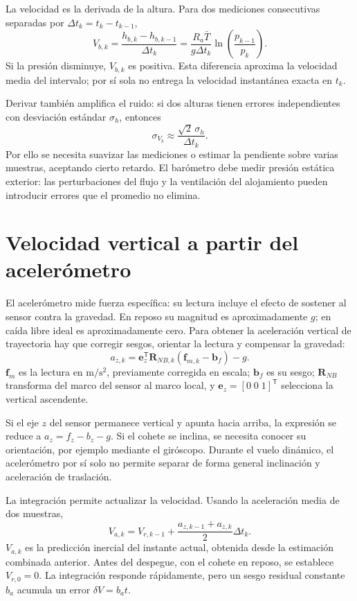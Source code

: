 \documentclass[11pt,a4paper]{article}
\begin{document}
La velocidad es la derivada de la altura. Para dos mediciones consecutivas separadas por $\Delta t_k=t_k-t_{k-1}$,
\begin{equation}
 V_{b,k}=\frac{h_{b,k}-h_{b,k-1}}{\Delta t_k}
 =\frac{R_a\bar T}{g\Delta t_k}\ln\left(\frac{p_{k-1}}{p_k}\right).
\end{equation}
Si la presión disminuye, $V_{b,k}$ es positiva. Esta diferencia aproxima la velocidad media del intervalo; por sí sola no entrega la velocidad instantánea exacta en $t_k$.

Derivar también amplifica el ruido: si dos alturas tienen errores independientes con desviación estándar $\sigma_h$, entonces
\begin{equation}
 \sigma_{V_b}\approx\frac{\sqrt{2}\,\sigma_h}{\Delta t_k}.
\end{equation}
Por ello se necesita suavizar las mediciones o estimar la pendiente sobre varias muestras, aceptando cierto retardo. El barómetro debe medir presión estática exterior: las perturbaciones del flujo y la ventilación del alojamiento pueden introducir errores que el promedio no elimina.

\newpage
\section{Velocidad vertical a partir del acelerómetro}
El acelerómetro mide fuerza específica: su lectura incluye el efecto de sostener al sensor contra la gravedad. En reposo su magnitud es aproximadamente $g$; en caída libre ideal es aproximadamente cero. Para obtener la aceleración vertical de trayectoria hay que corregir sesgos, orientar la lectura y compensar la gravedad:
\begin{equation}
 a_{z,k}=\mathbf e_z^{\mathsf T}\mathbf R_{NB,k}
 (\mathbf f_{m,k}-\mathbf b_f)-g.
\end{equation}
$\mathbf f_m$ es la lectura en $\mathrm{m/s^2}$, previamente corregida en escala; $\mathbf b_f$ es su sesgo; $\mathbf R_{NB}$ transforma del marco del sensor al marco local, y $\mathbf e_z=[0\;0\;1]^{\mathsf T}$ selecciona la vertical ascendente.

Si el eje $z$ del sensor permanece vertical y apunta hacia arriba, la expresión se reduce a $a_z=f_z-b_z-g$. Si el cohete se inclina, se necesita conocer su orientación, por ejemplo mediante el giróscopo. Durante el vuelo dinámico, el acelerómetro por sí solo no permite separar de forma general inclinación y aceleración de traslación.

La integración permite actualizar la velocidad. Usando la aceleración media de dos muestras,
\begin{equation}
 V_{a,k}=V_{r,k-1}+\frac{a_{z,k-1}+a_{z,k}}{2}\Delta t_k.
\end{equation}
$V_{a,k}$ es la predicción inercial del instante actual, obtenida desde la estimación combinada anterior. Antes del despegue, con el cohete en reposo, se establece $V_{r,0}=0$. La integración responde rápidamente, pero un sesgo residual constante $b_a$ acumula un error $\delta V=b_a t$.
\end{document}
